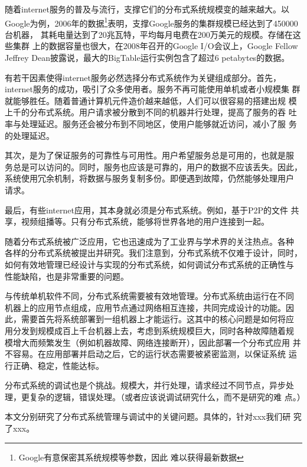 随着internet服务的普及与流行，支撑它们的分布式系统规模变的越来越大。以
Google为例，2006年的数据\footnote{Google有意保密其系统规模等参数，因此
难以获得最新数据}表明，支撑Google服务的集群规模已经达到了450000台机器，
其耗电量达到了20兆瓦特，平均每月电费在200万美元的规模。存储在这些集群
上的数据容量也很大，在2008年召开的Google I/O会议上，Google Fellow
Jeffrey Dean披露说，最大的BigTable运行实例包含了超过6 petabytes的数据。


有若干因素使得internet服务必然选择分布式系统作为关键组成部分。首先，
internet服务的成功，吸引了众多使用者。服务不再可能使用单机或者小规模集
群就能够胜任。随着普通计算机元件造价越来越低，人们可以很容易的搭建出规
模上千的分布式系统。用户请求被分散到不同的机器并行处理，提高了服务的吞
吐率与处理延迟。服务还会被分布到不同地区，使用户能够就近访问，减小了服
务的处理延迟。

其次，是为了保证服务的可靠性与可用性。用户希望服务总是可用的，也就是服
务总是可以访问的。同时，服务也应该是可靠的，用户的数据不应该丢失。因此，
系统使用冗余机制，将数据与服务复制多份。即便遇到故障，仍然能够处理用户
请求。

最后，有些internet应用，其本身就必须是分布式系统。例如，基于P2P的文件
共享，视频组播等。只有分布式系统，能够将世界各地的用户连接到一起。


随着分布式系统被广泛应用，它也迅速成为了工业界与学术界的关注热点。各种
各样的分布式系统被提出并研究。我们注意到，分布式系统不仅难于设计，同时，
如何有效地管理已经设计与实现的分布式系统，如何调试分布式系统的正确性与
性能缺陷，也是非常重要的问题。

与传统单机软件不同，分布式系统需要被有效地管理。分布式系统由运行在不同
机器上的应用节点组成，应用节点通过网络相互连接，共同完成设计的功能。因
此，需要首先将系统部署到一组机器上才能运行。这其中的核心问题是如何将应
用分发到规模成百上千台机器上去，考虑到系统规模巨大，同时各种故障随着规
模增大而频繁发生（例如机器故障、网络连接断开），因此部署一个分布式应用
并不容易。在应用部署并启动之后，它的运行状态需要被紧密监测，以保证系统
运行正确、稳定，性能达标。

分布式系统的调试也是个挑战。规模大，并行处理，请求经过不同节点，异步处
理，更复杂的逻辑，错误处理。（或者应该说调试研究什么，而不是研究的难
点。）

本文分别研究了分布式系统管理与调试中的关键问题。具体的，针对xxx我们研
究了xxx。


